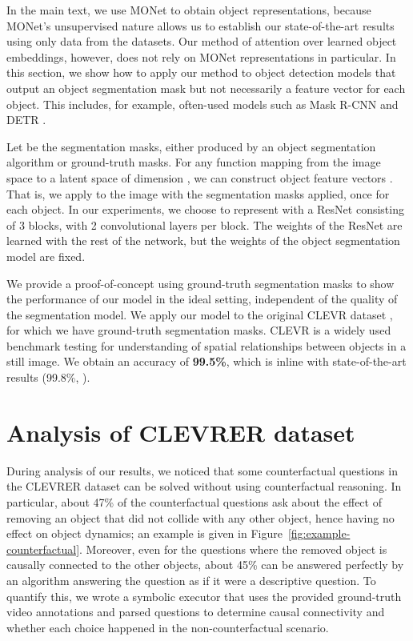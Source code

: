 \documentclass{article}
\begin{document}
In the main text, we  use MONet to obtain object representations,
because MONet's unsupervised nature allows us to establish our state-of-the-art results using only data from the datasets.
Our method of attention over learned object embeddings, however,
does not rely on MONet representations in particular.
In this section, we show how to apply our method to object detection models that output an object segmentation mask
but not necessarily a feature vector for each object.
This includes, for example,
often-used models such as Mask R-CNN and DETR \citep{he2017maskrcnn, detr}.

Let  be the segmentation
masks, either produced by an object segmentation algorithm or
ground-truth masks.
For any function 
mapping from the image space to a latent space of dimension ,
we can construct object feature vectors
.
That is, we apply  to the image with the segmentation masks applied, once for each object.
In our experiments, we choose to represent  with a
ResNet consisting of 3 blocks, with 2 convolutional layers per block.
The weights of the ResNet are learned with the rest of the network,
but the weights of the object segmentation model are fixed.

We provide a proof-of-concept using ground-truth segmentation masks
to show the performance of our model
in the ideal setting, independent of the quality of the segmentation model.
We apply our model to the original CLEVR dataset \citep{Johnson2016clevr},
for which we have ground-truth segmentation masks.
CLEVR is a widely used benchmark testing for understanding
of spatial relationships between objects in a still image.
We obtain an accuracy of \textbf{99.5\%},
which is inline with state-of-the-art results (99.8\%, \citep{nsvqa}).


\section{Analysis of CLEVRER dataset}
\label{appendix:clevrer_flaw}


During analysis of our results, we noticed that some counterfactual questions in the CLEVRER dataset can be solved without using counterfactual reasoning.
In particular, about 47\% of the counterfactual questions
ask about the effect of removing an object that did not collide
with any other object, hence having no effect on object dynamics;
an example is given in Figure~\ref{fig:example-counterfactual}.
Moreover, even for the questions
where the removed object is causally connected
to the other objects,
about 45\% can be answered perfectly by an algorithm
answering the question as if it were a descriptive question.
To quantify this, we wrote a symbolic executor that uses the provided ground-truth video annotations and parsed questions to determine causal connectivity and whether each choice happened in the non-counterfactual scenario.
\end{document}
